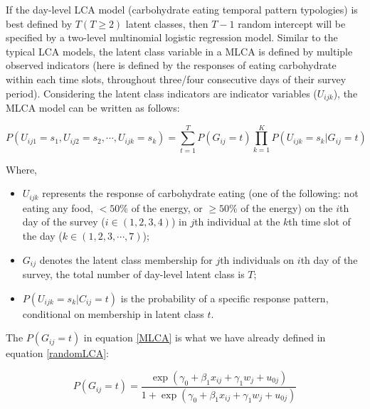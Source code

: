 If the day-level LCA model (carbohydrate eating temporal pattern typologies) is best defined by $T (T \geqslant 2)$ latent classes, then $T-1$ random intercept will be specified by a two-level multinomial logistic regression model. Similar to the typical LCA models, the latent class variable in a MLCA is defined by multiple observed indicators (here is defined by the responses of eating carbohydrate within each time slots, throughout three/four consecutive days of their survey period). Considering the latent class indicators are indicator variables ($U_{ijk}$), the MLCA model can be written as follows:\vspace{-1cm}

\begin{equation}
P(U_{ij1} = s_1, U_{ij2} = s_2, \cdots, U_{ijk} = s_{k}) = \sum_{t=1}^{T}P(G_{ij}=t)\prod_{k=1}^{K}P(U_{ijk} = s_k | G_{ij} = t)
\label{MLCA}
\end{equation}
\vspace{-0.8cm}


Where, 

\begin{itemize}
	\item $ U_{ijk} $ represents the response of carbohydrate eating (one of the following: not eating any food, $< 50\%$ of the energy, or $\geqslant 50\%$ of the energy) on the $i$th day of the survey ($i \in (1,2,3,4)$) in $j$th individual at the $k$th time slot of the day ($k \in (1, 2, 3, \cdots, 7)$);
	\item $G_{ij}$ denotes the latent class membership for $j$th individuals on $i$th day of the survey, the total number of day-level latent class is $T$;
	\item $P(U_{ijk} = s_k|C_{ij} = t)$ is the probability of a specific response pattern, conditional on membership in latent class $t$.
\end{itemize}


The $P(G_{ij} = t)$ in equation \ref{MLCA} is what we have already defined in equation \ref{randomLCA}: \vspace{-0.3cm} 

\begin{equation}
P(G_{ij} = t) = \frac{\exp{(\gamma_0 + \beta_{1}x_{ij} + \gamma_1 w_j + u_{0j})}}{1 + \exp{(\gamma_0 + \beta_{1}x_{ij} + \gamma_1 w_j + u_{0j})}} 
\end{equation}

